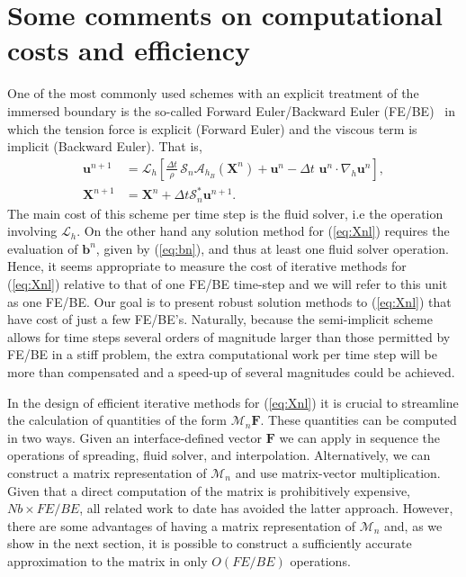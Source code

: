 \documentclass[preprint,12pt]{elsarticle}
\begin{document}
\section{Some comments on computational costs and efficiency} 
\label{Sec:Costs}
One of the most commonly used schemes with an explicit treatment of the immersed boundary is the 
so-called Forward Euler/Backward Euler (FE/BE)~\cite{SW99} in which the tension force is explicit (Forward Euler) and the 
viscous term is implicit (Backward Euler). That is,
\begin{align}
\mathbf{u}^{n+1} &= \mathcal{L}_h \left[\frac{\Delta t}{\rho}\, \mathcal{S}_n\mathcal{A}_{h_B}(\mathbf{X}^{n})+\mathbf{u}^n-\Delta t \, \, \mathbf{u}^n \cdot \nabla_h \mathbf{u}^n\right], \label{eq:FE} \\
\mathbf{X}^{n+1}&=\mathbf{X}^n +\Delta t\mathcal{S}^*_n\mathbf{u}^{n+1}. \label{eq:BE}
\end{align}
The main cost of this scheme per time step is the fluid solver, i.e the operation involving $\mathcal{L}_h$.  On the other hand
any solution method for (\ref{eq:Xnl}) requires the evaluation of $\mathbf{b}^n$, given by (\ref{eq:bn}), and thus  at
least one fluid solver operation. Hence, it seems appropriate to measure the cost of iterative methods for (\ref{eq:Xnl}) relative to that 
of one FE/BE time-step and we will refer to this unit as one FE/BE. 
Our goal is to present robust solution methods to (\ref{eq:Xnl}) that have cost of just a few FE/BE's. Naturally, 
because the semi-implicit scheme allows for time steps several orders of magnitude larger than those permitted by FE/BE in a stiff problem,  the extra computational work per time step will be more than compensated and a speed-up of several magnitudes could be achieved. 

In the design of efficient iterative methods for (\ref{eq:Xnl}) it is crucial to streamline the calculation of quantities of the form
$\mathcal{M}_n\mathbf{F}$. These quantities can be computed in two ways.  Given an interface-defined vector $\mathbf{F}$
we can apply in sequence the operations of spreading, fluid solver, and interpolation. Alternatively,  we can construct a matrix representation of $\mathcal{M}_n$ and use matrix-vector multiplication.  Given that a direct computation of the matrix
is prohibitively expensive, $Nb \times FE/BE$, all related work to date has avoided the latter approach.  However, 
there are some advantages of having a matrix representation of $\mathcal{M}_n$ and, as we show in the next section,  it is possible to
construct a sufficiently accurate approximation to the matrix in only $O(FE/BE)$ operations.
\end{document}
